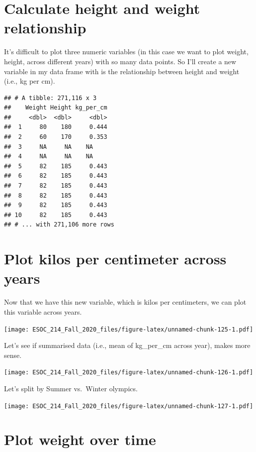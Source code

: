 \documentclass[
]{book}
\begin{document}
\hypertarget{calculate-height-and-weight-relationship}{%
\section{Calculate height and weight relationship}\label{calculate-height-and-weight-relationship}}

It's difficult to plot three numeric variables (in this case we want to plot weight, height, across different years) with so many data points. So I'll create a new variable in my data frame with is the relationship between height and weight (i.e., kg per cm).

\begin{verbatim}
## # A tibble: 271,116 x 3
##    Weight Height kg_per_cm
##     <dbl>  <dbl>     <dbl>
##  1     80    180     0.444
##  2     60    170     0.353
##  3     NA     NA    NA    
##  4     NA     NA    NA    
##  5     82    185     0.443
##  6     82    185     0.443
##  7     82    185     0.443
##  8     82    185     0.443
##  9     82    185     0.443
## 10     82    185     0.443
## # ... with 271,106 more rows
\end{verbatim}

\hypertarget{plot-kilos-per-centimeter-across-years}{%
\section{Plot kilos per centimeter across years}\label{plot-kilos-per-centimeter-across-years}}

Now that we have this new variable, which is kilos per centimeters, we can plot this variable across years.

\texttt{[image: ESOC\_214\_Fall\_2020\_files/figure-latex/unnamed-chunk-125-1.pdf]}

Let's see if summarised data (i.e., mean of kg\_per\_cm across year), makes more sense.

\texttt{[image: ESOC\_214\_Fall\_2020\_files/figure-latex/unnamed-chunk-126-1.pdf]}

Let's split by Summer vs.~Winter olympics.

\texttt{[image: ESOC\_214\_Fall\_2020\_files/figure-latex/unnamed-chunk-127-1.pdf]}

\hypertarget{plot-weight-over-time}{%
\section{Plot weight over time}\label{plot-weight-over-time}}
\end{document}
